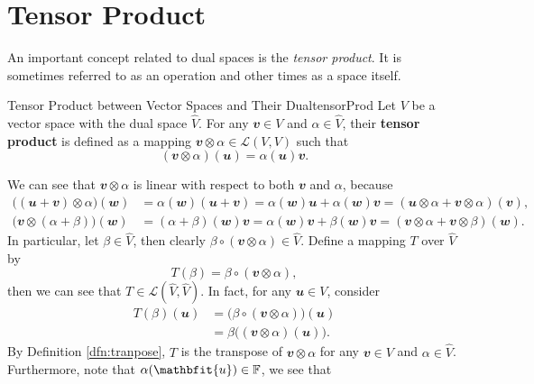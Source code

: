 \documentclass[math, code]{amznotes}
\theoremstyle{remark}
\begin{document}
\section{Tensor Product}
An important concept related to dual spaces is the \textit{tensor product}. It is sometimes referred to as an operation and other times as a space itself.
\begin{dfnbox}{Tensor Product between Vector Spaces and Their Dual}{tensorProd}
    Let $V$ be a vector space with the dual space $\widehat{V}$. For any $\mathbfit{v} \in V$ and $\alpha \in \widehat{V}$, their {\color{red} \textbf{tensor product}} is defined as a mapping $\mathbfit{v} \otimes \alpha \in \mathcal{L}(V, V)$ such that
    \begin{equation*}
        (\mathbfit{v} \otimes \alpha)(\mathbfit{u}) = \alpha(\mathbfit{u})\mathbfit{v}.
    \end{equation*}
\end{dfnbox}
We can see that $\mathbfit{v} \otimes \alpha$ is linear with respect to both $\mathbfit{v}$ and $\alpha$, because
\begin{align*}
    \bigl((\mathbfit{u + v}) \otimes \alpha\bigr)(\mathbfit{w}) & = \alpha(\mathbfit{w})(\mathbfit{u + v}) = \alpha(\mathbfit{w})\mathbfit{u} + \alpha(\mathbfit{w})\mathbfit{v} = (\mathbfit{u} \otimes \alpha + \mathbfit{v} \otimes \alpha)(\mathbfit{v}), \\
    \bigl(\mathbfit{v} \otimes (\alpha + \beta)\bigr)(\mathbfit{w}) & = (\alpha + \beta)(\mathbfit{w})\mathbfit{v} = \alpha(\mathbfit{w})\mathbfit{v} + \beta(\mathbfit{w})\mathbfit{v} = (\mathbfit{v} \otimes \alpha + \mathbfit{v} \otimes \beta)(\mathbfit{w}).
\end{align*}
In particular, let $\beta \in \widehat{V}$, then clearly $\beta \circ (\mathbfit{v} \otimes \alpha) \in \widehat{V}$. Define a mapping $T$ over $\widehat{V}$ by
\begin{equation*}
    T(\beta) = \beta \circ (\mathbfit{v} \otimes \alpha),
\end{equation*}
then we can see that $T \in \mathcal{L}\left(\widehat{V}, \widehat{V}\right)$. In fact, for any $\mathbfit{u} \in V$, consider
\begin{align*}
    T(\beta)(\mathbfit{u}) & = \bigl(\beta \circ (\mathbfit{v} \otimes \alpha)\bigr)(\mathbfit{u}) \\
    & = \beta\bigl((\mathbfit{v} \otimes \alpha)(\mathbfit{u})\bigr).
\end{align*}
By Definition \ref{dfn:tranpose}, $T$ is the transpose of $\mathbfit{v} \otimes \alpha$ for any $\mathbfit{v} \in V$ and $\alpha \in \widehat{V}$. Furthermore, note that $\alpha(\mathbfit{u}) \in \F$, we see that
\end{document}
